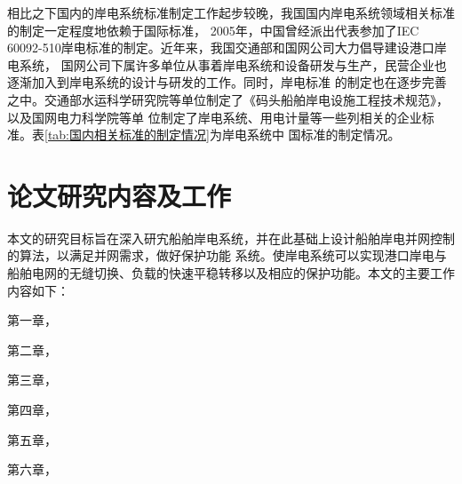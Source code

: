 相比之下国内的岸电系统标准制定工作起步较晚，我国国内岸电系统领域相关标准的制定一定程度地依赖于国际标准\cite{SP4}，
2005年，中国曾经派出代表参加了IEC 60092-510岸电标准的制定。近年来，我国交通部和国网公司大力倡导建设港口岸电系统，
国网公司下属许多单位从事着岸电系统和设备研发与生产，民营企业也逐渐加入到岸电系统的设计与研发的工作。同时，岸电标准
的制定也在逐步完善之中。交通部水运科学研究院等单位制定了《码头船舶岸电设施工程技术规范》，以及国网电力科学院等单
位制定了岸电系统、用电计量等一些列相关的企业标准\cite{SP14}。表\ref{tab:国内相关标准的制定情况}为岸电系统中
国标准的制定情况。

\begin{table}[!htp]
	\centering
	\caption[国内相关标准的制定情况]{国内相关标准的制定情况}
	\label{tab:国内相关标准的制定情况}
\end{table}

\section{论文研究内容及工作}
本文的研究目标旨在深入研宄船舶岸电系统，并在此基础上设计船舶岸电并网控制的算法，以满足并网需求，做好保护功能
系统。使岸电系统可以实现港口岸电与船舶电网的无缝切换、负载的快速平稳转移以及相应的保护功能。本文的主要工作内容如下：

第一章，

第二章，

第三章，

第四章，

第五章，

第六章，


